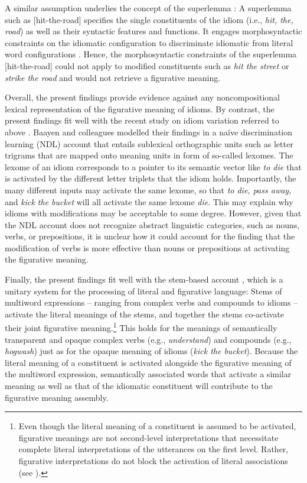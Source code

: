 \documentclass[output=paper]{langsci/langscibook}
\begin{document}
A similar assumption underlies the concept of the superlemma \citep{sprenger:2006}: A superlemma such as [hit-the-road] specifies the single constituents of the idiom (i.e., \textit{hit, the, road}) as well as their syntactic features and functions. It engages morphosyntactic constraints on the idiomatic configuration to discriminate idiomatic from literal word configurations \citep{sprenger:2006}. Hence, the morphosyntactic constraints of the superlemma [hit-the-road] could not apply to modified constituents such as \textit{hit the street} or \textit{strike the road} and would not retrieve a figurative meaning. 


Overall, the present findings provide evidence against any noncompositional lexical representation of the figurative meaning of idioms. By contrast, the present findings fit well with the recent study on idiom variation referred to above \citep{geeraert:2017}. Baayen and colleagues modelled their findings in a naïve discrimination learning (NDL) account \citep{baayen:2013,baayen:2011,baayen:2016} that entails sublexical orthographic units such as letter trigrams that are mapped onto meaning units in form of so-called lexomes. The lexome of an idiom corresponds to a pointer to its semantic vector like \textit{to die} that is activated by the different letter triplets that the idiom holds. Importantly, the many different inputs may activate the same lexome, so that \textit{to die, pass away,} and \textit{kick the bucket} will all activate the same lexome \textit{die}. This may explain why idioms with modifications may be acceptable to some degree. However, given that the NDL account does not recognize abstract linguistic categories, such as nouns, verbs, or prepositions, it is unclear how it could account for the finding that the modification of verbs is more effective than nouns or prepositions at activating the figurative meaning. 

Finally, the present findings fit well with the stem-based account \citep{gunther:2018,rabanus:2008,smolka:2017,smolka:2007,smolka:2014,smolka:2015,smolka:2018}, which is a unitary system for the processing of literal and figurative language: Stems of multiword expressions -- ranging from complex verbs and compounds to idioms -- activate the literal meanings of the stems, and together the stems co-activate their joint figurative meaning.\footnote{Even though the literal meaning of a constituent is assumed to be activated, figurative meanings are not second-level interpretations that necessitate complete literal interpretations of the utterances on the first level. Rather, figurative interpretations do not block the activation of literal associations (see \citealt{gibbs:2002}).} This holds for the meanings of semantically transparent and opaque complex verbs (e.g., \textit{understand}) and compounds (e.g., \textit{hogwash}) just as for the opaque meaning of idioms (\textit{kick the bucket}). Because the literal meaning of a constituent is activated alongside the figurative meaning of the multiword expression, semantically associated words that activate a similar meaning as well as that of the idiomatic constituent will contribute to the figurative meaning assembly. 
\end{document}
